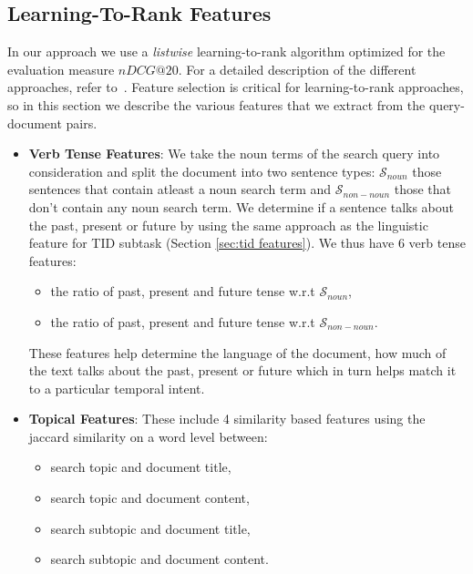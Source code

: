 \documentclass{sig-alternate}
\begin{document}
\subsection{Learning-To-Rank Features}\label{ltor_f}
In our approach we use a \textit{listwise} learning-to-rank algorithm optimized for the evaluation measure $nDCG@20$. For a detailed description of the different approaches, refer to~\cite{ltor}. Feature selection is critical for learning-to-rank approaches, so in this section we describe the various features that we extract from the query-document pairs.
\begin{itemize}
\item\textbf{Verb Tense Features}: We take the noun terms of the search query into consideration and split the document into two sentence types: $\mathcal S_{noun}$ those sentences that contain atleast a noun search term and $\mathcal S_{non-noun}$ those that don't contain any noun search term. We determine if a sentence talks about the past, present or future by using the same approach as the linguistic feature for TID subtask (Section \ref{sec:tid features}). We thus have \textsf{6 verb tense features}: 
\begin{itemize}
\item the ratio of past, present and future tense w.r.t $\mathcal S_{noun}$,
\item the ratio of past, present and future tense w.r.t $\mathcal S_{non-noun}$. 
\end{itemize}
These features help determine the language of the document, how much of the text talks about the past, present or future which in turn helps match it to a particular temporal intent. 
\item\textbf{Topical Features}: These include \textsf{4 similarity based features} using the jaccard similarity on a word level between:
   \begin{itemize}
       \item search topic and document title,
       \item search topic and document content,
       \item search subtopic and document title, 
       \item search subtopic and document content. 
   \end{itemize}

\end{itemize}
\end{document}
